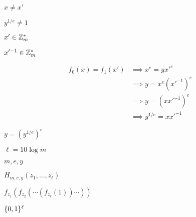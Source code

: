 \documentclass[10pt]{book}
\begin{document}
\begin{mdSnippets}
\begin{mdInlineSnippet}
$x \neq x'$\end{mdInlineSnippet}%
\begin{mdInlineSnippet}[1aa20486f3f8159c44b75c3696b0cbb0]%
$y^{1/e} \neq 1$\end{mdInlineSnippet}%
\begin{mdInlineSnippet}[8b93567ca3733e40450c7356696fde09]%
$x' \in \mathbb{Z}_m^*$\end{mdInlineSnippet}%
\begin{mdInlineSnippet}[17f5a96a87e6c18220a41ff2cd145e56]%
$x'^{-1} \in \mathbb{Z}_m^*$\end{mdInlineSnippet}%
\begin{mdDisplaySnippet}[3637c56422dd3391e642e5d1f68be830]%
\[%
\begin{aligned}
f_0(x) = f_1(x') &\implies x^e =yx'^e \\
&\implies y = x^e(x'^{-1})^e \\
&\implies y = (xx'^{-1})^e \\
&\implies y^{1/e} =xx'^{-1} 
\end{aligned}
\]%
\end{mdDisplaySnippet}%
\begin{mdInlineSnippet}[404e2600625ee22c616a4701d4905721]%
$y = (y^{1/e})^e$\end{mdInlineSnippet}%
\begin{mdInlineSnippet}[0aa40d98ad4d03a7b465561001238ddd]%
$\ell = 10\log m$\end{mdInlineSnippet}%
\begin{mdInlineSnippet}[1502feb554537ae0700d668087f94e4b]%
$m,e,y$\end{mdInlineSnippet}%
\begin{mdInlineSnippet}[a507041a2586d14bf25ac8c4c3daec9b]%
$H_{m,e,y}(z_1,\ldots,z_\ell)$\end{mdInlineSnippet}%
\begin{mdInlineSnippet}[19276b6830932ab2db00b780f47a3787]%
$f_{z_1}(f_{z_2}(\cdots (f_{z_{\ell}}(1))\cdots))$\end{mdInlineSnippet}%
\begin{mdInlineSnippet}%
$\{0,1\}^\ell$\end{mdInlineSnippet}%
\begin{mdInlineSnippet}[9fc929ca8e961b6fb602959db12ff119]%

\end{mdInlineSnippet}
\end{mdSnippets}
\end{document}
